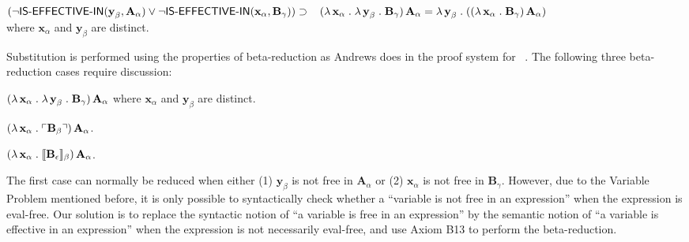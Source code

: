 \documentclass[fleqn]{llncs}
\begin{document}
\begin{minipage}{\textwidth}
    \item[] $(\neg \mbox{\sf IS-EFFECTIVE-IN}(\textbf{y}_\beta,\textbf{A}_\alpha)\vee 
      \neg \mbox{\sf IS-EFFECTIVE-IN}(\textbf{x}_\alpha,\textbf{B}_\gamma)) \supset {}\\ 
      \hspace*{2ex}(\lambda\, \textbf{x}_\alpha \mathrel. 
      \lambda\, \textbf{y}_\beta \mathrel. \textbf{B}_\gamma) \, \textbf{A}_\alpha =
      \lambda\, \textbf{y}_\beta \mathrel. 
      ((\lambda\, \textbf{x}_\alpha \mathrel. \textbf{B}_\gamma) \, \textbf{A}_\alpha)$\\
      where $\textbf{x}_\alpha$ and $\textbf{y}_\beta$ are distinct.

   \ei

\end{minipage}

\medskip

Substitution is performed using
the properties of beta-reduction as Andrews does in the proof system
for {\qzero}~\cite[p.~213]{Andrews02}.  The following three
beta-reduction cases require discussion:

\be

  \item $(\lambda\, \textbf{x}_\alpha \mathrel. \lambda\,
    \textbf{y}_\beta \mathrel. \textbf{B}_\gamma) \, \textbf{A}_\alpha$
    where $\textbf{x}_\alpha$ and $\textbf{y}_\beta$ are distinct.

  \item $(\lambda\, \textbf{x}_\alpha \mathrel.
      \ulcorner\textbf{B}_\beta\urcorner) \, \textbf{A}_\alpha$.

  \item $(\lambda\, \textbf{x}_\alpha \mathrel.
    \llbracket\textbf{B}_\epsilon\rrbracket_\beta) \, \textbf{A}_\alpha$.

\ee

The first case can normally be reduced when either (1)
$\textbf{y}_\beta$ is not free in $\textbf{A}_\alpha$ or (2)
$\textbf{x}_\alpha$ is not free in $\textbf{B}_\gamma$.  However, due
to the Variable Problem mentioned before, it is only possible to
syntactically check whether a ``variable is not free in an
expression'' when the expression is eval-free.  Our solution
is to replace the syntactic notion of ``a variable is free in
an expression'' by the semantic notion of ``a variable is effective in
an expression'' when the expression is not necessarily eval-free, and
use Axiom B13 to perform the beta-reduction.  
\end{document}
